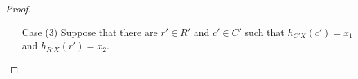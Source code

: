 \begin{proof}
\begin{itemize}
        \item[Case (3)] Suppose that there are $r' \mathop{\in} R'$ and $c' \mathop{\in} C'$ such that $h_{C'X}(c') \mathop{=} x_1$ and $h_{R'X}(r') \mathop{=} x_2$.
        

\end{itemize}
\end{proof}
